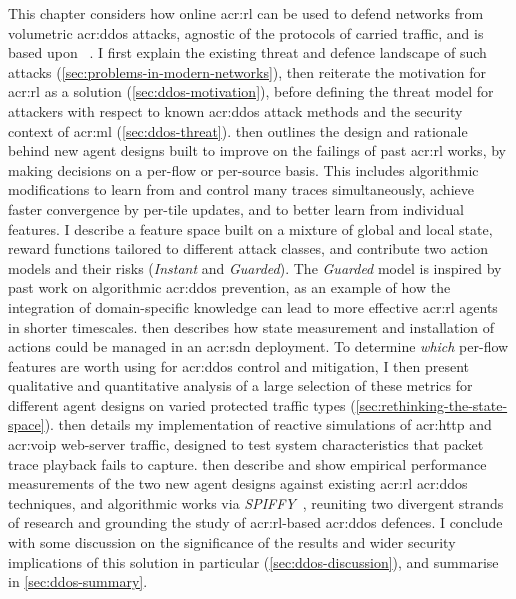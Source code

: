 This chapter considers how online \gls{acr:rl} can be used to defend networks from volumetric \gls{acr:ddos} attacks, agnostic of the protocols of carried traffic, and is based upon ~\parencite{DBLP:journals/tnsm/SimpsonRP20}.
I first explain the existing threat and defence landscape of such attacks (\cref{sec:problems-in-modern-networks}), then reiterate the motivation for \gls{acr:rl} as a solution (\cref{sec:ddos-motivation}), before defining the threat model for attackers with respect to known \gls{acr:ddos} attack methods and the security context of \gls{acr:ml} (\cref{sec:ddos-threat}).
 then outlines the design and rationale behind new agent designs built to improve on the failings of past \gls{acr:rl} works, by making decisions on a per-flow or per-source basis.
This includes algorithmic modifications to learn from and control many traces simultaneously, achieve faster convergence by per-tile updates, and to better learn from individual features.
I describe a feature space built on a mixture of global and local state, reward functions tailored to different attack classes, and contribute two action models and their risks (\emph{Instant} and \emph{Guarded}).
The \emph{Guarded} model is inspired by past work on algorithmic \gls{acr:ddos} prevention, as an example of how the integration of domain-specific knowledge can lead to more effective \gls{acr:rl} agents in shorter timescales.
 then describes how state measurement and installation of actions could be managed in an \gls{acr:sdn} deployment.
To determine \emph{which} per-flow features are worth using for \gls{acr:ddos} control and mitigation, I then present qualitative and quantitative analysis of a large selection of these metrics for different agent designs on varied protected traffic types (\cref{sec:rethinking-the-state-space}).
 then details my implementation of reactive simulations of \gls{acr:http} and \gls{acr:voip} web-server traffic, designed to test system characteristics that packet trace playback fails to capture.
 then describe and show empirical performance measurements of the two new agent designs against existing \gls{acr:rl} \gls{acr:ddos} techniques, and algorithmic works via \emph{SPIFFY}~\parencite{DBLP:conf/ndss/KangGS16}, reuniting two divergent strands of research and grounding the study of \gls{acr:rl}-based \gls{acr:ddos} defences.
I conclude with some discussion on the significance of the results and wider security implications of this solution in particular (\cref{sec:ddos-discussion}), and summarise in \cref{sec:ddos-summary}.

